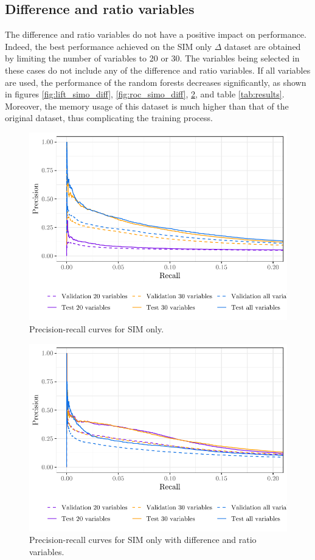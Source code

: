 \subsection{Difference and ratio variables}

The difference and ratio variables do not have a positive impact on performance.
Indeed, the best performance achieved on the SIM only $\Delta$ dataset are
obtained by limiting the number of variables to 20 or 30. The variables being
selected in these cases do not include any of the difference and ratio
variables. If all variables are used, the performance of the random forests
decreases significantly, as shown in figures \ref{fig:lift_simo_diff},
\ref{fig:roc_simo_diff}, \ref{fig:pr_simo_diff}, and table \ref{tab:results}.
Moreover, the memory usage of this dataset is much higher than that of the
original dataset, thus complicating the training process.

\begin{figure}
    \centering
    \includegraphics[width=0.9\linewidth]{figures/pr_simo.pdf}
    \caption{Precision-recall curves for SIM only.}
    \label{fig:pr_simo}
\end{figure}

\begin{figure}
    \centering
    \includegraphics[width=0.9\linewidth]{figures/pr_simo_diff.pdf}
    \caption{Precision-recall curves for SIM only with difference and ratio
    variables.}
    \label{fig:pr_simo_diff}
\end{figure}

